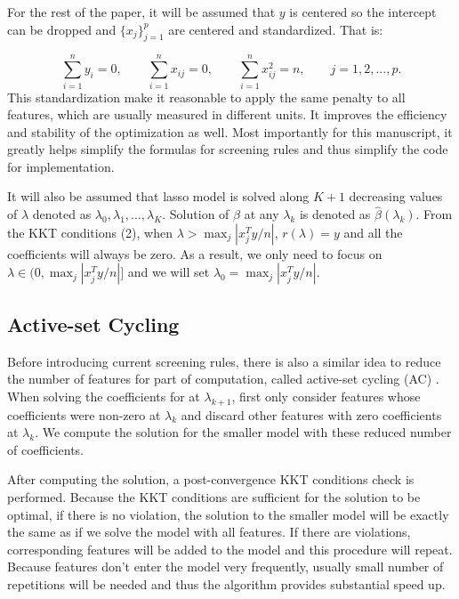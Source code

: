\documentclass{article}
\begin{document}
For the rest of the paper, it will be assumed that $y$ is centered so the intercept can be dropped and $\{x_j\}_{j=1}^p$ are centered and standardized. That is:

\begin{equation}
    \sum_{i=1}^ny_i=0, \qquad \sum_{i=1}^n x_{ij}=0, \qquad \sum_{i=1}^n x_{ij}^2=n,\qquad j=1,2,...,p.
\end{equation}
This standardization make it reasonable to apply the same penalty to all features, which are usually measured in different units. It improves the efficiency and stability of the optimization as well. Most importantly for this manuscript, it greatly helps simplify the formulas for screening rules and thus simplify the code for implementation.

It will also be assumed that lasso model is solved along $K+1$ decreasing values of $\lambda$ denoted as $\lambda_0,\lambda_1,...,\lambda_K$. Solution of $\beta$ at any $\lambda_k$ is denoted as $\hat{\beta}(\lambda_k)$. From the KKT conditions (2), when $\lambda>\max_j|x_j^Ty/n|$, $r(\lambda)=y$ and all the coefficients will always be zero. As a result, we only need to focus on $\lambda\in (0,\max_j|x_j^Ty/n|]$ and we will set $\lambda_0=\max_j|x_j^Ty/n|$.

\subsection{Active-set Cycling}

Before introducing current screening rules, there is also a similar idea to reduce the number of features for part of computation, called active-set cycling (AC) \cite{lee2007efficient}. When solving the coefficients for at $\lambda_{k+1}$, first only consider features whose coefficients were non-zero at $\lambda_k$ and discard other features with zero coefficients at $\lambda_k$. We compute the solution for the smaller model with these reduced number of coefficients.

After computing the solution, a post-convergence KKT conditions check is performed. Because the KKT conditions are sufficient for the solution to be optimal, if there is no violation, the solution to the smaller model will be exactly the same as if we solve the model with all features. If there are violations, corresponding features will be added to the model and this procedure will repeat. Because features don't enter the model very frequently, usually small number of repetitions will be needed and thus the algorithm provides substantial speed up.
\end{document}
